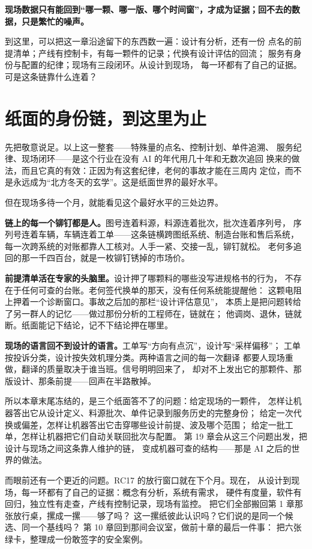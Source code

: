 \textbf{现场数据只有能回到“哪一颗、哪一版、哪个时间窗”，才成为证据；回不去的数据，只是繁忙的噪声。}

到这里，可以把这一章沿途留下的东西数一遍：设计有分析，还有一份
点名的前提清单；产线有控制卡，有每一颗件的记录；代换有设计评估的回流；
服务有身份与配置的纪律；现场有三段闭环。从设计到现场，
每一环都有了自己的证据。可是这条链靠什么连着？

\section{纸面的身份链，到这里为止}

先把敬意说足。以上这一整套——特殊量的点名、控制计划、单件追溯、
服务纪律、现场闭环——是这个行业在没有 AI 的年代用几十年和无数次追回
换来的做法，而且它真的有效：正因为有这套纪律，老何的事故才能在三周内
定位，而不是永远成为“北方冬天的玄学”。这是纸面世界的最好水平。

但在现场多待一个月，就能看见这个最好水平的三处边界。

\textbf{链上的每一个铆钉都是人。}图号连着料源，料源连着批次，批次连着序列号，
序列号连着车辆，车辆连着工单——这条链横跨图纸系统、制造台账和售后系统，
每一次跨系统的对账都靠人工核对。人手一紧、交接一乱，铆钉就松。
老何多追回的那一千四百台，就是一枚铆钉锈掉的市场价。

\textbf{前提清单活在专家的头脑里。}设计押了哪颗料的哪些没写进规格书的行为，
不存在于任何可查的台账。老何签代换单的那天，没有任何系统能提醒他：
这颗电阻上押着一个诊断窗口。事故之后加的那栏“设计评估意见”，
本质上是把问题转给了另一群人的记忆——做过那份分析的工程师在，链就在；
他调岗、退休，链就断。纸面能记下结论，记不下结论押在哪里。

\textbf{现场的语言回不到设计的语言。}工单写“方向有点沉”，设计写“采样偏移”；
工单按投诉分类，设计按失效机理分类。两种语言之间的每一次翻译
都要人现场重做，翻译的质量取决于谁当班。信号明明回来了，
却对不上发出它的那颗件、那版设计、那条前提——回声在半路散掉。

所以本章末尾冻结的，是三个纸面答不了的问题：给定现场的一颗件，
怎样让机器答出它从设计定义、料源批次、单件记录到服务历史的完整身份；
给定一次代换或偏差，怎样让机器答出它击穿哪些设计前提、波及哪个范围；
给定一批工单，怎样让机器把它们自动关联回批次与配置。
第 19 章会从这三个问题出发，把设计与现场之间这条靠人维护的链，
变成机器可查的结构——那是 AI 之后的世界的做法。

而眼前还有一个更近的问题。RC17 的放行窗口就在下个月。现在，
从设计到现场，每一环都有了自己的证据：概念有分析，系统有需求，
硬件有度量，软件有回归，独立性有走查，产线有控制记录，现场有监控。
把它们全部搬回第 1 章那张放行桌，摞成一摞——够了吗？
这一摞纸彼此认识吗？它们说的是同一个候选、同一个基线吗？
第 10 章回到那间会议室，做前十章的最后一件事：
把六张绿卡，整理成一份敢签字的安全案例。


